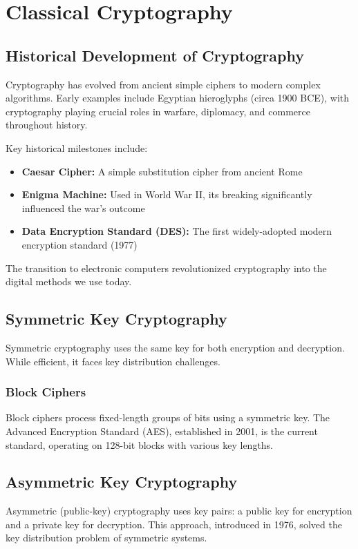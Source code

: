 \chapter{Classical Cryptography}

\section{Historical Development of Cryptography}
Cryptography has evolved from ancient simple ciphers to modern complex algorithms. Early examples include Egyptian hieroglyphs (circa 1900 BCE), with cryptography playing crucial roles in warfare, diplomacy, and commerce throughout history.

Key historical milestones include:
\begin{itemize}
    \item \textbf{Caesar Cipher:} A simple substitution cipher from ancient Rome
    \item \textbf{Enigma Machine:} Used in World War II, its breaking significantly influenced the war's outcome
    \item \textbf{Data Encryption Standard (DES):} The first widely-adopted modern encryption standard (1977)
\end{itemize}

The transition to electronic computers revolutionized cryptography into the digital methods we use today.

\section{Symmetric Key Cryptography}
Symmetric cryptography uses the same key for both encryption and decryption. While efficient, it faces key distribution challenges.

\subsection{Block Ciphers}
Block ciphers process fixed-length groups of bits using a symmetric key. The Advanced Encryption Standard (AES), established in 2001, is the current standard, operating on 128-bit blocks with various key lengths.

\section{Asymmetric Key Cryptography}
Asymmetric (public-key) cryptography uses key pairs: a public key for encryption and a private key for decryption. This approach, introduced in 1976, solved the key distribution problem of symmetric systems.

